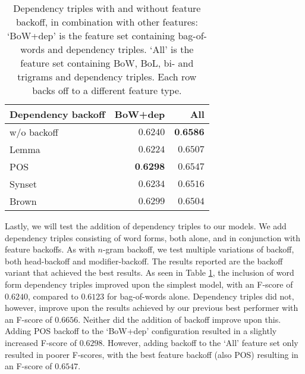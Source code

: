 \documentclass[11pt,letterpaper]{article}
\begin{document}
\begin{table}
  \begin{smaller}    
  \begin{center}
    \begin{tabular}{lrr}
      \toprule           
      Dependency backoff & BoW+dep & All\\
      \midrule
      w/o backoff & $0.6240$ & $\textbf{0.6586}$ \\
      Lemma & $0.6224$ & $0.6507$ \\
      POS & $\textbf{0.6298}$ & $0.6547$ \\ %
      Synset & $0.6234$ & $0.6516$  \\ %
      Brown & $0.6299$ & $0.6504$ \\ %
      \bottomrule
    \end{tabular}
  \end{center}
  \caption{Dependency triples with and without feature backoff, in combination with other features: 
`BoW+dep' is the feature set containing bag-of-words and dependency triples. `All' is the feature set containing BoW, BoL, bi- and trigrams and dependency triples. Each row backs off to a different feature type.}
  \label{tab:depbackoff}
  \end{smaller}
\end{table}

Lastly, we will test the addition of dependency triples to our models. We add
dependency triples consisting of word forms, both alone, and in conjunction
with feature backoffs. As with $n$-gram backoff, we test multiple variations of
backoff, both head-backoff and modifier-backoff. The results reported are the
backoff variant that achieved the best results. As seen in Table
\ref{tab:depbackoff}, the inclusion of word form dependency triples improved
upon the simplest model, with an F-score of $0.6240$, compared to $0.6123$ for
bag-of-words alone. Dependency triples did not, however, improve upon the
results achieved by our previous best performer with an F-score of $0.6656$. %
Neither did the addition of backoff improve upon this. Adding POS backoff
to the `BoW+dep' configuration resulted in a slightly increased F-score of
$0.6298$. However, adding backoff to the `All' feature set only resulted in poorer F-scores, with the best feature backoff (also POS) resulting in an F-score of $0.6547$.
\end{document}
